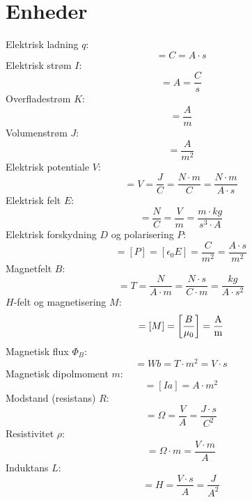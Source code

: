 \documentclass[]{article}
\theoremstyle{definition}
\begin{document}
\section{Enheder}
Elektrisk ladning $q$:
\begin{equation*}
	[q] = \unit{C} = \unit{A \cdot s}
\end{equation*}
Elektrisk strøm $I$:
\begin{equation*}
	[I] = \unit{A} = \unit{\frac{C}{s}}
\end{equation*}
Overfladestrøm $K$:
\begin{equation*}
	[K] = \unit{\frac{A}{m}}
\end{equation*}
Volumenstrøm $J$:
\begin{equation*}
	[J] = \unit{\frac{A}{m^2}}
\end{equation*}
Elektrisk potentiale $V$:
\begin{equation*}
	[V] = \unit{V} = \unit{\frac{J}{C}} = \unit{\frac{N \cdot m}{C}} = \unit{\frac{N \cdot m}{A \cdot s}}
\end{equation*}
Elektrisk felt $E$:
\begin{equation*}
	[E] = \unit{\frac{N}{C}} = \unit{\frac{V}{m}} = \unit{\frac{m\cdot kg}{s^3 \cdot A}}
\end{equation*}
Elektrisk forskydning $D$ og polarisering $P$:
\begin{equation*}
	[D] = [P] = [\epsilon_0 E] = \unit{\frac{C}{m^2}} = \unit{\frac{A \cdot s}{m^2}}
\end{equation*}
Magnetfelt $B$:
\begin{equation*}
	[B] = \unit{T} = \unit{\frac{N}{A \cdot m} =  \unit{\frac{N \cdot s}{C \cdot m}} = \unit{\frac{kg}{A \cdot s^2}}}
\end{equation*}
$H$-felt og magnetisering $M$:
\begin{equation*}
	[H] = [M] = \qty[\frac{B}{\mu_0}] = \unit{\frac{A}{m}}
\end{equation*}
Magnetisk flux $ \Phi_B$:
\begin{equation*}
	[\Phi_B] = \unit{Wb} = \unit{T \cdot m^2} = \unit{V \cdot s}
\end{equation*}
Magnetisk dipolmoment $m$:
\begin{equation*}
	[m] = [Ia] = \unit{A \cdot m^2}
\end{equation*}
Modstand (resistans) $R$:
\begin{equation*}
	[R] = \unit{\Omega} = \unit{\frac{V}{A}} = \unit{\dfrac{J \cdot s}{C^2}}
\end{equation*}
Resistivitet $\rho$:
\begin{equation*}
	[\rho] = \unit{\Omega \cdot m} = \unit{\frac{V \cdot m}{A}}
\end{equation*}
Induktans $L$:
\begin{equation*}
	[L] = \unit{H} = \unit{\frac{V\cdot s}{A}} = \unit{\frac{J}{A^2}}
\end{equation*}
\end{document}
